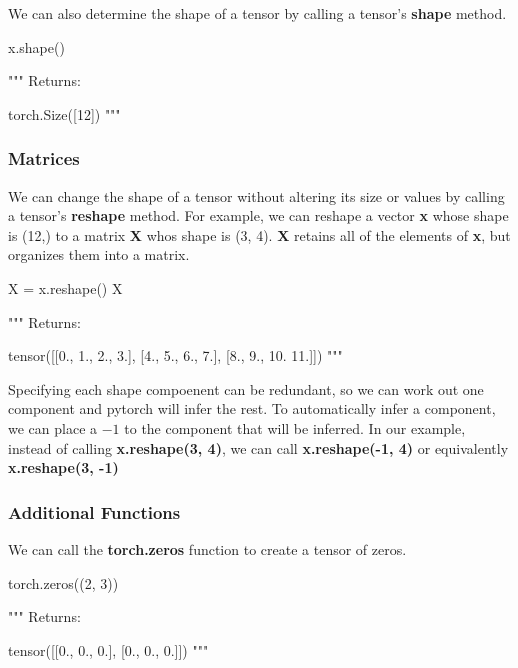 \documentclass[12pt]{article}
\begin{document}
We can also determine the shape of a tensor by calling a tensor's \textbf{shape} method.

\vspace{6pt}
\begin{python}
x.shape()

"""
Returns:

  torch.Size([12])
"""
\end{python}
\vspace{6pt}

\subsubsection{Matrices}
We can change the shape of a tensor without altering its size or values by calling a tensor's \textbf{reshape} method.  For example, we can reshape a vector \textbf{x} whose shape is (12,) to a matrix \textbf{X} whos shape is (3, 4).  \textbf{X} retains all of the elements of \textbf{x}, but organizes them into a matrix.

\newpage
\vspace{6pt}
\begin{python}
X = x.reshape()
X

"""
Returns:

  tensor([[0., 1., 2., 3.],
    [4., 5., 6., 7.],
    [8., 9., 10. 11.]])
"""
\end{python}
\vspace{6pt}

Specifying each shape compoenent can be redundant, so we can work out one component and pytorch will infer the rest.  To automatically infer a component, we can place a $-1$ to the component that will be inferred.  In our example, instead of calling \textbf{x.reshape(3, 4)}, we can call \textbf{x.reshape(-1, 4)} or equivalently \textbf{x.reshape(3, -1)}

\subsubsection{Additional Functions}
We can call the \textbf{torch.zeros} function to create a tensor of zeros.

\vspace{6pt}
\begin{python}
torch.zeros((2, 3))

"""
Returns:

  tensor([[0., 0., 0.],
    [0., 0., 0.]])
"""
\end{python}
\vspace{6pt}
\end{document}
